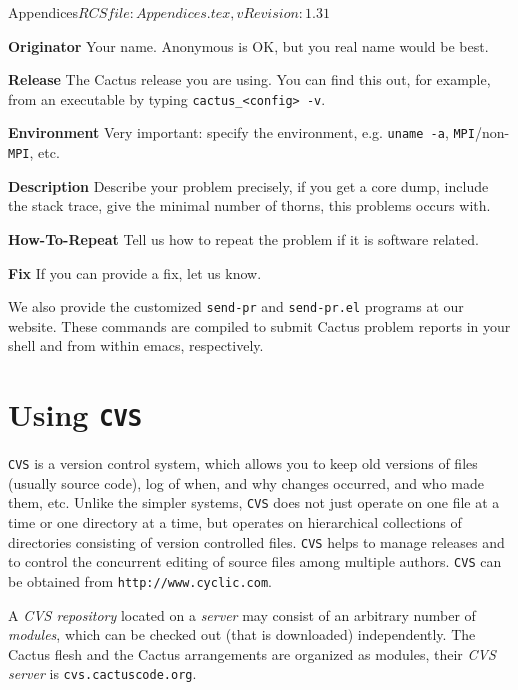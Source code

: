 \begin{cactuspart}{6}{Appendices}{$RCSfile: Appendices.tex,v $}{$Revision: 1.31 $}
\begin{Lentry}
\item[{\bf Originator}] Your name. Anonymous is OK, but you real name
   would be best.

\item[{\bf Release}] The Cactus release you are using. You can find this
   out, for example, from an executable by typing {\tt cactus\_<config> -v}.

\item[{\bf Environment}] Very important: specify the environment,
e.g. {\tt uname -a}, {\tt MPI}/non-{\tt MPI}, etc.

\item[{\bf Description}] Describe your problem precisely, if you get a
core dump, include the stack trace, give the minimal number of thorns,
this problems occurs with.

\item[{\bf How-To-Repeat}] Tell us how to repeat the problem if it is
software related.

\item[{\bf Fix}] If you can provide a fix, let us know.
\end{Lentry}

We also provide the customized {\tt send-pr} and {\tt send-pr.el} programs at
our website. These commands are compiled to submit Cactus problem
reports in your shell and from within emacs, respectively.


\label{sec:usgn}

\chapter{Using {\tt CVS}}
\label{sec:uscv}
{\tt CVS} is a version control system, which allows you to  keep
old versions of files (usually source code), log of
when, and why changes occurred, and who made them,  etc.
Unlike the simpler systems, {\tt CVS} does not just operate on one file at a
time or one directory at a time,  but
operates  on  hierarchical collections of directories consisting of
version controlled files.  {\tt CVS} helps to  manage
releases  and  to control the concurrent editing of source
files among multiple  authors. {\tt CVS} can be obtained from
{\tt http://www.cyclic.com}.

A {\em CVS repository} located on a {\em server} may consist of an arbitrary
number of {\em modules}, which can be checked out (that is downloaded)
independently. The Cactus flesh and the Cactus
arrangements are organized as modules, their {\em CVS server} is {\tt cvs.cactuscode.org}.


\end{cactuspart}
